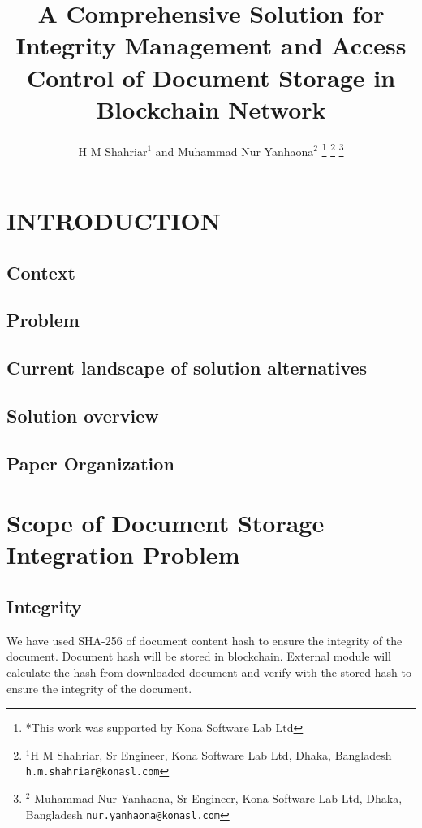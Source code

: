 \documentclass[letterpaper, 10 pt, conference]{ieeeconf}  %
\title{\LARGE \bf
A Comprehensive Solution for Integrity Management and Access Control of Document Storage in Blockchain Network
}
\author{H M Shahriar$^{1}$ and Muhammad Nur Yanhaona$^{2}$%
\thanks{*This work was supported by Kona Software Lab Ltd}%
\thanks{$^{1}$H M Shahriar, Sr Engineer, Kona Software Lab Ltd, Dhaka, Bangladesh
{\tt\small h.m.shahriar@konasl.com}}%
\thanks{$^{2}$ Muhammad Nur Yanhaona, Sr Engineer, Kona Software Lab Ltd, Dhaka, Bangladesh
        {\tt\small nur.yanhaona@konasl.com}}%
}
\begin{document}
\maketitle
\thispagestyle{empty}
\pagestyle{empty}


\begin{abstract}



\end{abstract}


\section{INTRODUCTION}
\subsection{Context}
\subsection{Problem}
\subsection{Current landscape of solution alternatives}
\subsection{Solution overview}
\subsection{Paper Organization}


\section{Scope of Document Storage Integration Problem}

\subsection{Integrity}

We have used SHA-256 of document content hash to ensure the integrity of the document. Document hash will be stored in blockchain. External module will calculate the hash from downloaded document and verify with the stored hash to ensure the integrity of the document.
\end{document}
